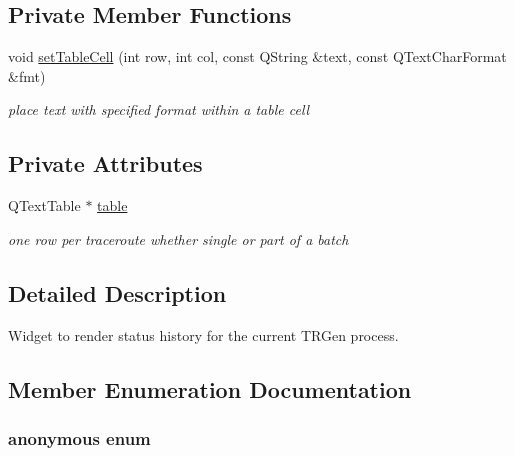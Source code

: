 \subsection*{Private Member Functions}
\begin{CompactItemize}
\item 
\hypertarget{classTrStatBrowser_696ff66afb74e0bce31ef163e0f3af7b}{
void \hyperlink{classTrStatBrowser_696ff66afb74e0bce31ef163e0f3af7b}{setTableCell} (int row, int col, const QString \&text, const QTextCharFormat \&fmt)}
\label{classTrStatBrowser_696ff66afb74e0bce31ef163e0f3af7b}

\begin{CompactList}\small\item\em place text with specified format within a table cell \item\end{CompactList}\end{CompactItemize}
\subsection*{Private Attributes}
\begin{CompactItemize}
\item 
\hypertarget{classTrStatBrowser_27a93a05583e04350746522f96801e46}{
QTextTable $\ast$ \hyperlink{classTrStatBrowser_27a93a05583e04350746522f96801e46}{table}}
\label{classTrStatBrowser_27a93a05583e04350746522f96801e46}

\begin{CompactList}\small\item\em one row per traceroute whether single or part of a batch \item\end{CompactList}\end{CompactItemize}


\subsection{Detailed Description}
Widget to render status history for the current TRGen process. 

\subsection{Member Enumeration Documentation}
\hypertarget{classTrStatBrowser_fcbf6150a14800fac3d2f871b5e86034}{
\subsubsection["@1]{\setlength{\rightskip}{0pt plus 5cm}anonymous enum}}
\label{classTrStatBrowser_fcbf6150a14800fac3d2f871b5e86034}


